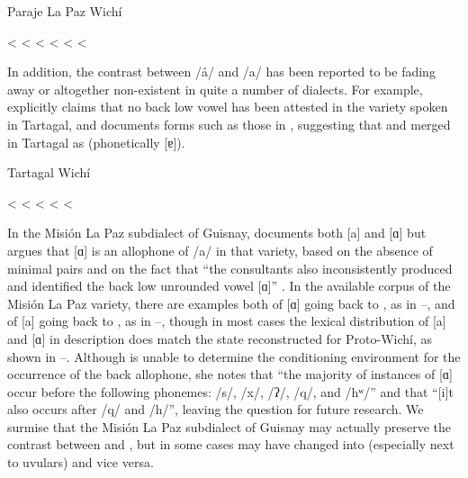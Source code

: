 \ea
Paraje La Paz Wichí \citep{AFG067}\\
    \begin{xlist}
        \ex {} <  \label{wi-vow-plp-iyela}
        \ex {} < 
        \ex {} < 
        \ex {} \recind {} <  \label{wi-vow-plp-laqe}
        \ex {} <  \label{wi-vow-plp-lick}
        \ex {} <  \label{wi-vow-plp-hard}
    \end{xlist}
\z

In addition, the contrast between /å/ and /a/ has been reported to be fading away or altogether non-existent in quite a number of dialects. For example, \citet[359]{LCB15} explicitly claims that no back low vowel has been attested in the variety spoken in Tartagal, and documents forms such as those in , suggesting that  and  merged in Tartagal as  (phonetically [ɐ]).

\ea \label{wi-ao-a-tart}
Tartagal Wichí \citep[359]{LCB15}\\
    \begin{xlist}
        \ex {} < 
        \ex {} < 
        \ex  {} < 
        \ex {} < 
        \ex {} < 
    \end{xlist}
\z

In the Misión La Paz subdialect of Guisnay, \citet{MA08} documents both [a] and [ɑ] but argues that [ɑ] is an allophone of /a/ in that variety, based on the absence of minimal pairs and on the fact that ``the consultants also inconsistently produced and identified the back low unrounded vowel [ɑ]'' \citep[71]{MA08}. In the available corpus of the Misión La Paz variety, there are examples both of [ɑ] going back to , as in –, and of [a] going back to , as in –, though in most cases the lexical distribution of [a] and [ɑ] in  description does match the state reconstructed for Proto-Wichí, as shown in –. Although \citet[71]{MA08} is unable to determine the conditioning environment for the occurrence of the back allophone, she notes that ``the majority of instances of [ɑ] occur before the following phonemes: /s/, /x/, /ʔ/, /q/, and /hʷ/'' and that ``[i]t also occurs after /q/ and /h/'', leaving the question for future research. We surmise that the Misión La Paz subdialect of Guisnay may actually preserve the contrast between  and , but in some cases  may have changed into  (especially next to uvulars) and vice versa.

